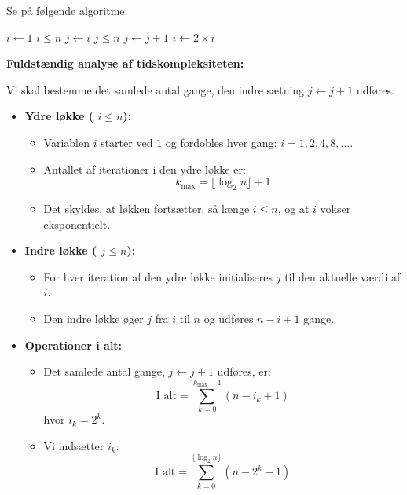 \begin{example}

    Se på følgende algoritme:
    
    \begin{codebox}
        \li $i \gets 1$
        \li \While $i \leq n$ \Do
        \li     $j \gets i$
        \li     \While $j \leq n$ \Do
        \li         $j \gets j + 1$
                \End
        \li     $i \gets 2 \times i$
            \End
    \end{codebox}
    
    \textbf{Fuldstændig analyse af tidskompleksiteten:}
    
    Vi skal bestemme det samlede antal gange, den indre sætning $j \gets j + 1$ udføres.
    
    \begin{itemize}
        \item \textbf{Ydre løkke (\texttt{\While} $i \leq n$):}
        \begin{itemize}
            \item Variablen $i$ starter ved $1$ og fordobles hver gang: $i = 1, 2, 4, 8, \ldots$.
            \item Antallet af iterationer i den ydre løkke er:
            \[ k_{\text{max}} = \lfloor \log_2 n \rfloor + 1 \]
            \item Det skyldes, at løkken fortsætter, så længe $i \leq n$, og at $i$ vokser eksponentielt.
        \end{itemize}
        \item \textbf{Indre løkke (\texttt{\While} $j \leq n$):}
        \begin{itemize}
            \item For hver iteration af den ydre løkke initialiseres $j$ til den aktuelle værdi af $i$.
            \item Den indre løkke øger $j$ fra $i$ til $n$ og udføres $n - i + 1$ gange.
        \end{itemize}
        \item \textbf{Operationer i alt:}
        \begin{itemize}
            \item Det samlede antal gange, $j \gets j + 1$ udføres, er:
            \[
            \text{I alt} = \sum_{k=0}^{k_{\text{max}} - 1} (n - i_k + 1)
            \]
            hvor $i_k = 2^k$.
            \item Vi indsætter $i_k$:
            \[
            \text{I alt} = \sum_{k=0}^{\lfloor \log_2 n \rfloor} (n - 2^k + 1)
\]
\end{itemize}
\end{itemize}
\end{example}
